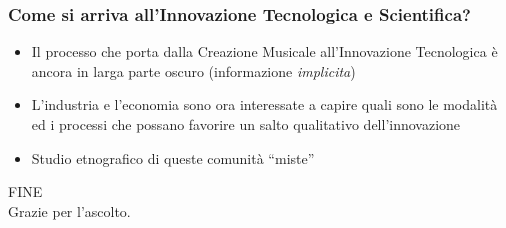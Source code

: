 \documentclass[compress]{beamer}
\begin{document}
\begin{frame}
    \frametitle{Come si arriva all'Innovazione Tecnologica e Scientifica?}

    \begin{itemize}[<+- | alert@+->]
        \item Il processo che porta dalla Creazione Musicale all'Innovazione
            Tecnologica \`e ancora in larga parte oscuro (informazione
            \emph{implicita})
        \item L'industria e l'economia sono ora interessate a capire quali
            sono le modalit\`a ed i processi che possano favorire un salto
            qualitativo dell'innovazione
        \item Studio etnografico di queste comunit\`a ``miste''
    \end{itemize}
    
\end{frame}

\begin{frame}
    \begin{center}
        {\Huge FINE}\\[2\baselineskip]
        Grazie per l'ascolto.
    \end{center}
\end{frame}
\end{document}
